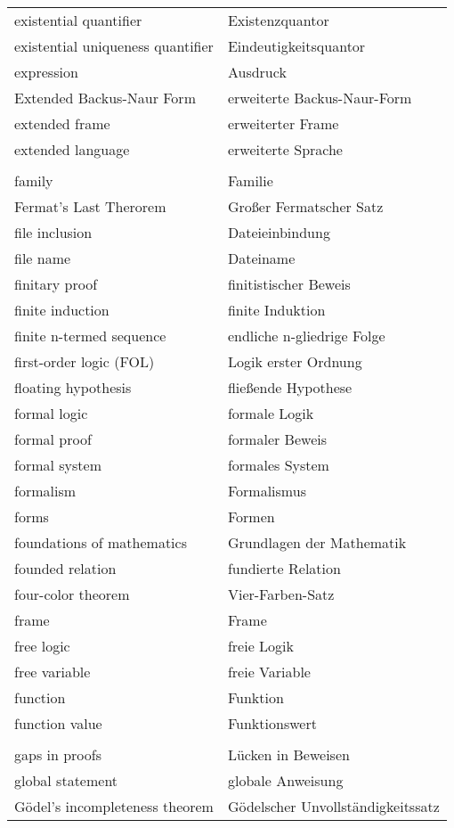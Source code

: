 \begin{longtabu}   { @{} X[l] X[l] }
    existential quantifier & Existenzquantor \\
    existential uniqueness quantifier & Eindeutigkeitsquantor \\
    expression & Ausdruck \\
    Extended Backus-Naur Form & erweiterte Backus-Naur-Form \\
    extended frame & erweiterter Frame \\
    extended language & erweiterte Sprache \\
     & \\
    family & Familie \\
    Fermat's Last Therorem & Großer Fermatscher Satz \\
    file inclusion & Dateieinbindung \\
    file name & Dateiname \\
    finitary proof & finitistischer Beweis \\
    finite induction & finite Induktion \\
    finite n-termed sequence & endliche n-gliedrige Folge \\
    first-order logic (FOL) & Logik erster Ordnung \\
    floating hypothesis & fließende Hypothese \\
    formal logic & formale Logik \\
    formal proof & formaler Beweis \\
    formal system & formales System \\
    formalism & Formalismus \\
    forms & Formen \\
    foundations of mathematics & Grundlagen der Mathematik \\
    founded relation & fundierte Relation \\
    four-color theorem & Vier-Farben-Satz \\
    frame & Frame \\
    free logic & freie Logik \\
    free variable & freie Variable \\
    function & Funktion \\
    function value & Funktionswert \\
     & \\
    gaps in proofs & Lücken in Beweisen \\
    global statement & globale Anweisung \\
    Gödel's incompleteness theorem &  Gödelscher Unvollständigkeitssatz \\

\end{longtabu}
